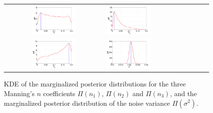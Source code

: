 \documentclass[review,12pt]{elsarticle}
\begin{document}
 \begin{figure}[ht]
        \begin{tabular}{clc}
\includegraphics[width=0.475\textwidth]{Figure15a.pdf} &
\includegraphics[width=0.475\textwidth]{Figure15b.pdf} \\
\includegraphics[width=0.475\textwidth]{Figure15c.pdf} &
\includegraphics[width=0.475\textwidth]{Figure15d.pdf}
        \end{tabular}
        \caption{KDE of the marginalized posterior distributions for the three Manning's $n$ coefficients 
        $\Pi(n_1)$, $\Pi(n_2)$ and $\Pi(n_3)$, 
and the marginalized posterior distribution of the noise variance 
$\Pi(\sigma^2)$.}
\label{fig:pdfs} 
        \end{figure}
\end{document}
